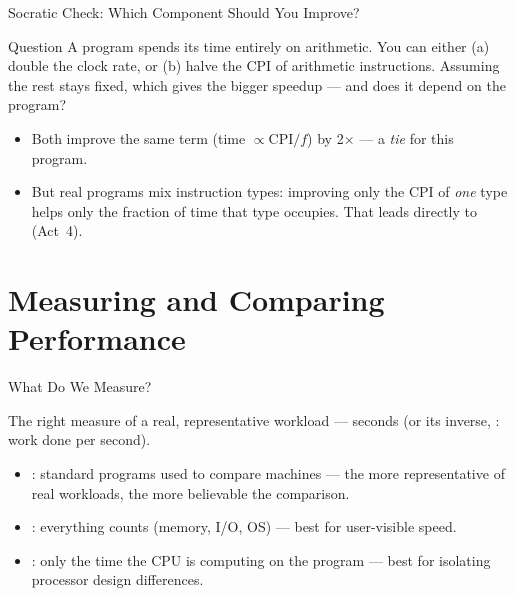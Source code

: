 \documentclass[aspectratio=169]{beamer}
\begin{document}
\begin{frame}{Socratic Check: Which Component Should You Improve?}
  \begin{alertblock}{Question}
    A program spends its time entirely on arithmetic. You can either (a) double
    the clock rate, or (b) halve the CPI of arithmetic instructions. Assuming
    the rest stays fixed, which gives the bigger speedup --- and does it
    depend on the program?
  \end{alertblock}
  \begin{itemize}
    \item Both improve the same term (time $\propto \text{CPI}/f$) by 2$\times$
      --- a \emph{tie} for this program.
    \item But real programs mix instruction types: improving only the CPI of
      \emph{one} type helps only the fraction of time that type occupies.
      That leads directly to  (Act~4).
  \end{itemize}
\end{frame}


\section{Measuring and Comparing Performance}

\begin{frame}{What Do We Measure?}
  \begin{block}{The right measure}
     of a real, representative workload --- seconds (or
    its inverse, : work done per second).
  \end{block}
  \begin{itemize}
    \item {}: standard programs used to compare machines --- the
      more representative of real workloads, the more believable the
      comparison.
    \item {}: everything counts (memory, I/O, OS) --- best
      for user-visible speed.
    \item {}: only the time the CPU is computing on the program ---
      best for isolating processor design differences.
  \end{itemize}
\end{frame}
\end{document}
